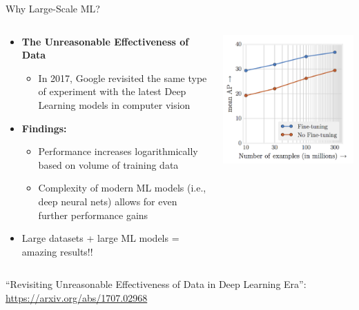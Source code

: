 \begin{frame}{Why Large-Scale ML?}
    \begin{columns}
        \begin{column}{0.6\textwidth}
            \begin{itemize}
                \item \textbf{The Unreasonable Effectiveness of Data}
                \begin{itemize}
                    \item In 2017, Google revisited the same type of experiment with the latest Deep Learning models in computer vision
                \end{itemize}
                \item \textbf{Findings:}
                \begin{itemize}
                    \item Performance increases logarithmically based on volume of training data
                    \item Complexity of modern ML models (i.e., deep neural nets) allows for even further performance gains
                \end{itemize}
                \item Large datasets + large ML models = amazing results!!
            \end{itemize}
        \end{column}
        \begin{column}{0.4\textwidth}
            \includegraphics[width=\linewidth]{images/decision-trees/decision-trees-2.png}
        \end{column}
    \end{columns}

    \vspace{0.3cm}
    \tiny “Revisiting Unreasonable Effectiveness of Data in Deep Learning Era”: \href{https://arxiv.org/abs/1707.02968}{https://arxiv.org/abs/1707.02968}
\end{frame}


